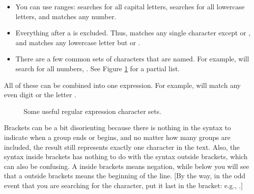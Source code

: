\begin{itemize}
\item You can use ranges: \ci{[A-Z]} searches for all capital letters,
\ci{[A-Za-z]} searches for all lowercase letters, and \ci{[0-9]} matches
any number. 
\item {} Everything after a \ci{\that} is excluded. Thus, \ci{[\that{}fs]} matches
any single character except  or , and
\ci{[a-z\that{}fs]} matches any lowercase letter
but  or .
\item There are a few common sets of characters that are named. For
example, \bi{[[:digit:]]} will search for all numbers, \bi{[0-9]}. See
Figure \ref{regexchar} for a partial list. 
\end{itemize}

All of these can be combined into one expression. For example,
\bi{[eE[:digit:]\that{}13579]} will match any even digit or the letter .

\begin{figure}
\begin{center}
\end{center}
\caption{Some useful regular expression character sets.}\label{regexchar}
\end{figure}

Brackets can be a bit disorienting because there is nothing in the syntax
to indicate when a group ends or begins, and no matter how many groups are
included, the result still represents exactly one character in the text.
Also, the syntax inside brackets has nothing to do with the syntax
outside brackets, which can also be confusing. A \that{} inside brackets
means negation, while below you will see that a \that{} outside brackets
means the beginning of the line. [By the way, in the odd event that you are searching for the \that{} character, 
put it last in the bracket: e.g., .]

